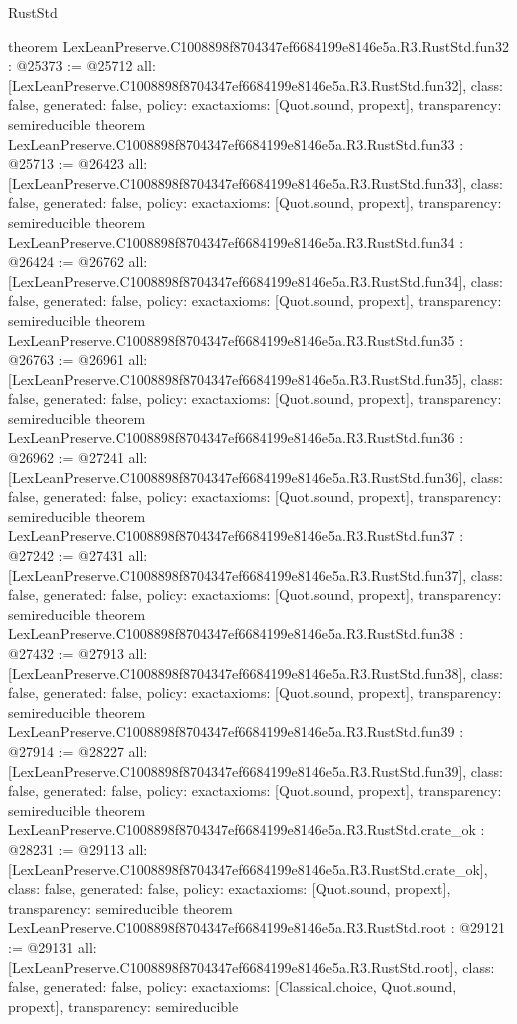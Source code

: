 \begin{lexlean}{RustStd}
\begin{coremodule}
{}
theorem LexLeanPreserve.C1008898f8704347ef6684199e8146e5a.R3.RustStd.fun32 : @25373 := @25712 {
  all: [LexLeanPreserve.C1008898f8704347ef6684199e8146e5a.R3.RustStd.fun32],
  class: false,
  generated: false,
  policy: exact{axioms: [Quot.sound, propext]},
  transparency: semireducible
}
theorem LexLeanPreserve.C1008898f8704347ef6684199e8146e5a.R3.RustStd.fun33 : @25713 := @26423 {
  all: [LexLeanPreserve.C1008898f8704347ef6684199e8146e5a.R3.RustStd.fun33],
  class: false,
  generated: false,
  policy: exact{axioms: [Quot.sound, propext]},
  transparency: semireducible
}
theorem LexLeanPreserve.C1008898f8704347ef6684199e8146e5a.R3.RustStd.fun34 : @26424 := @26762 {
  all: [LexLeanPreserve.C1008898f8704347ef6684199e8146e5a.R3.RustStd.fun34],
  class: false,
  generated: false,
  policy: exact{axioms: [Quot.sound, propext]},
  transparency: semireducible
}
theorem LexLeanPreserve.C1008898f8704347ef6684199e8146e5a.R3.RustStd.fun35 : @26763 := @26961 {
  all: [LexLeanPreserve.C1008898f8704347ef6684199e8146e5a.R3.RustStd.fun35],
  class: false,
  generated: false,
  policy: exact{axioms: [Quot.sound, propext]},
  transparency: semireducible
}
theorem LexLeanPreserve.C1008898f8704347ef6684199e8146e5a.R3.RustStd.fun36 : @26962 := @27241 {
  all: [LexLeanPreserve.C1008898f8704347ef6684199e8146e5a.R3.RustStd.fun36],
  class: false,
  generated: false,
  policy: exact{axioms: [Quot.sound, propext]},
  transparency: semireducible
}
theorem LexLeanPreserve.C1008898f8704347ef6684199e8146e5a.R3.RustStd.fun37 : @27242 := @27431 {
  all: [LexLeanPreserve.C1008898f8704347ef6684199e8146e5a.R3.RustStd.fun37],
  class: false,
  generated: false,
  policy: exact{axioms: [Quot.sound, propext]},
  transparency: semireducible
}
theorem LexLeanPreserve.C1008898f8704347ef6684199e8146e5a.R3.RustStd.fun38 : @27432 := @27913 {
  all: [LexLeanPreserve.C1008898f8704347ef6684199e8146e5a.R3.RustStd.fun38],
  class: false,
  generated: false,
  policy: exact{axioms: [Quot.sound, propext]},
  transparency: semireducible
}
theorem LexLeanPreserve.C1008898f8704347ef6684199e8146e5a.R3.RustStd.fun39 : @27914 := @28227 {
  all: [LexLeanPreserve.C1008898f8704347ef6684199e8146e5a.R3.RustStd.fun39],
  class: false,
  generated: false,
  policy: exact{axioms: [Quot.sound, propext]},
  transparency: semireducible
}
theorem LexLeanPreserve.C1008898f8704347ef6684199e8146e5a.R3.RustStd.crate_ok : @28231 := @29113 {
  all: [LexLeanPreserve.C1008898f8704347ef6684199e8146e5a.R3.RustStd.crate_ok],
  class: false,
  generated: false,
  policy: exact{axioms: [Quot.sound, propext]},
  transparency: semireducible
}
theorem LexLeanPreserve.C1008898f8704347ef6684199e8146e5a.R3.RustStd.root : @29121 := @29131 {
  all: [LexLeanPreserve.C1008898f8704347ef6684199e8146e5a.R3.RustStd.root],
  class: false,
  generated: false,
  policy: exact{axioms: [Classical.choice, Quot.sound, propext]},
  transparency: semireducible
}


\end{coremodule}
\end{lexlean}

